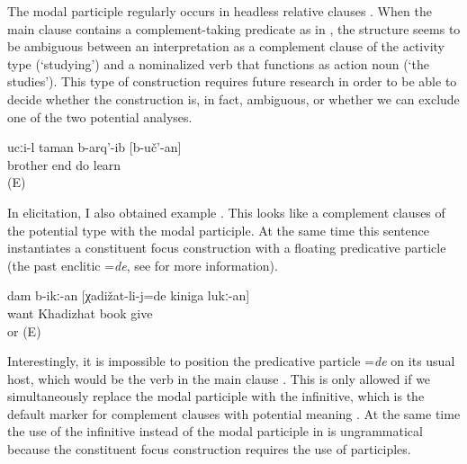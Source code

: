 The modal participle regularly occurs in headless relative clauses . When the main clause contains a complement-taking predicate as in , the structure seems to be ambiguous between an interpretation as a complement clause of the activity type (`studying') and a nominalized verb that functions as action noun (`the studies'). This type of construction requires future research in order to be able to decide whether the construction is, in fact, ambiguous, or whether we can exclude one of the two potential analyses.
 	
\begin{exe}	
	\ex	\label{ex:‎Brother finished to study / studying / the studies}
	\gll	ucːi-l	taman	b-arq'-ib	[b-uč'-an]\\
		brother	end	do	learn\\
	\glt	{} (E)
\end{exe}


In elicitation, I also obtained example . This looks like a complement clauses of the potential type with the modal participle. At the same time this sentence instantiates a constituent focus construction with a floating predicative particle (the past enclitic =\textit{de}, see  for more information). 

%
\begin{exe}
	\ex	\label{ex:‎I wanted to give the book to Khadizhat}
	\gll	dam	b-ikː-an	[χadižat-li-j=de	kiniga	lukː-an]\\
			want	Khadizhat	book	give\\
	\glt	{} or  (E)
	\end{exe}

Interestingly, it is impossible to position the predicative particle =\textit{de} on its usual host, which would be the verb in the main clause . This is only allowed if we simultaneously replace the modal participle with the infinitive, which is the default marker for complement clauses with potential meaning . At the same time the use of the infinitive instead of the modal participle in  is ungrammatical because the constituent focus construction requires the use of participles.

